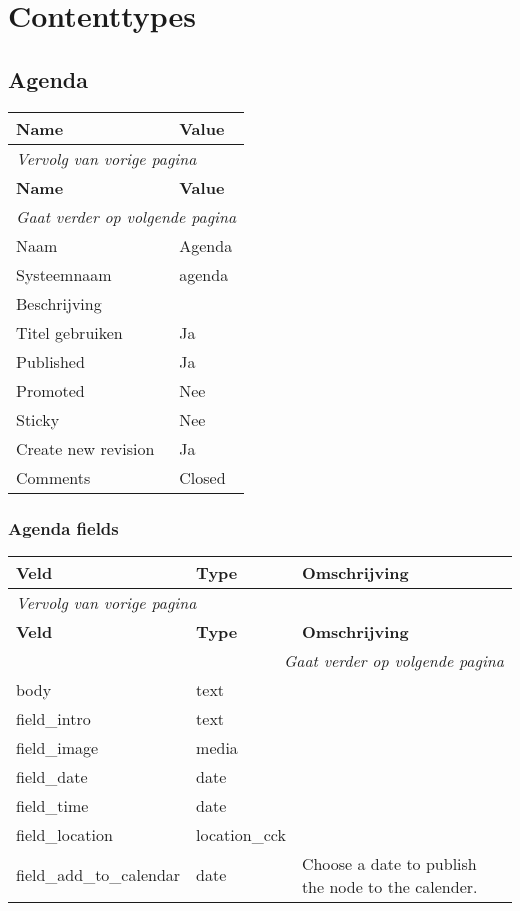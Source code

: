 \section{Contenttypes}\label{contenttypes}

\subsection{Agenda}
\label{sec:content-agenda}
  \begin{longtable}{| p{7.50cm}|p{7.50cm}|}
  \hline
  \rowcolor{tableheader}
  \textbf{Name} & \textbf{Value}  \tabularnewline
  \hline
\endfirsthead
\multicolumn{2}{l}{\textit{Vervolg van vorige pagina}} \\
\hline
\rowcolor{tableheader}
  \textbf{Name} & \textbf{Value}  \tabularnewline
  \hline
\hline
\endhead
\multicolumn{2}{r}{\textit{Gaat verder op volgende pagina}} \\
\endfoot
\hline
\endlastfoot
  Naam & Agenda  \tabularnewline
  \hline
  Systeemnaam & agenda  \tabularnewline
  \hline
  Beschrijving &   \tabularnewline
  \hline
  Titel gebruiken & Ja  \tabularnewline
  \hline
  Published & Ja  \tabularnewline
  \hline
  Promoted & Nee  \tabularnewline
  \hline
  Sticky & Nee  \tabularnewline
  \hline
  Create new revision & Ja  \tabularnewline
  \hline
  Comments & Closed  \tabularnewline
  \hline
  \end{longtable}

\subsubsection{Agenda fields}
  \begin{longtable}{| p{5.00cm}|p{5.00cm}|p{5.00cm}|}
  \hline
  \rowcolor{tableheader}
  \textbf{Veld} & \textbf{Type} & \textbf{Omschrijving}  \tabularnewline
  \hline
\endfirsthead
\multicolumn{3}{l}{\textit{Vervolg van vorige pagina}} \\
\hline
\rowcolor{tableheader}
  \textbf{Veld} & \textbf{Type} & \textbf{Omschrijving}  \tabularnewline
  \hline
\hline
\endhead
\multicolumn{3}{r}{\textit{Gaat verder op volgende pagina}} \\
\endfoot
\hline
\endlastfoot
  body & text &   \tabularnewline
  \hline
  field\_intro & text &   \tabularnewline
  \hline
  field\_image & media &   \tabularnewline
  \hline
  field\_date & date &   \tabularnewline
  \hline
  field\_time & date &   \tabularnewline
  \hline
  field\_location & location\_cck &   \tabularnewline
  \hline
  field\_add\_to\_calendar & date & Choose a date to publish the node to the calender.  \tabularnewline
  \hline
  \end{longtable}

